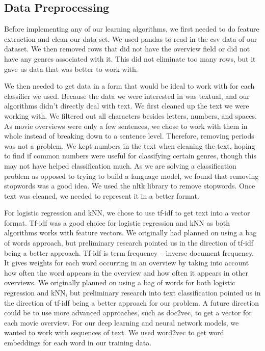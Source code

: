 \documentclass[sigconf]{acmart}
\begin{document}
\subsection{Data Preprocessing}
Before implementing any of our learning algorithms, we first needed to do feature extraction and clean our data set.  We used pandas to read in the csv data of our dataset.  We then removed rows that did not have the overview field or did not have any genres associated with it.  This did not eliminate too many rows, but it gave us data that was better to work with.

We then needed to get data in a form that would be ideal to work with for each classifier we used.  Because the data we were interested in was textual, and our algorithms didn't directly deal with text. We first cleaned up the text we were working with.  We filtered out all characters besides letters, numbers, and spaces. As movie overviews were only a few sentences, we chose to work with them in whole instead of breaking down to a sentence level. Therefore, removing periods was not a problem.  We kept numbers in the text when cleaning the text, hoping to find if common numbers were useful for classifying certain genres, though this may not have helped classification much.  As we are solving a classification problem as opposed to trying to build a language model, we found that removing stopwords was a good idea. We used the nltk library to remove stopwords. Once text was cleaned, we needed to represent it in a better format. 

For logistic regression and kNN, we chose to use tf-idf to get text into a vector format. Tf-idf was a good choice for logistic regression and kNN as both algorithms works with feature vectors. We originally had planned on using a bag of words approach, but preliminary research pointed us in the direction of tf-idf being a better approach.
Tf-idf is term frequency -- inverse document frequency.  It gives weights for each word occurring in an overview by taking into account how often the word appears in the overview and how often it appears in other overviews. We originally planned on using a bag of words for both logistic regression and kNN, but preliminary research into text classification pointed us in the direction of tf-idf being a better approach for our problem.  A future direction could be to use more advanced approaches, such as doc2vec, to get a vector for each movie overview.  
For our deep learning and neural network models, we wanted to work with sequences of text.  We used word2vec to get word embeddings for each word in our training data.
\end{document}
